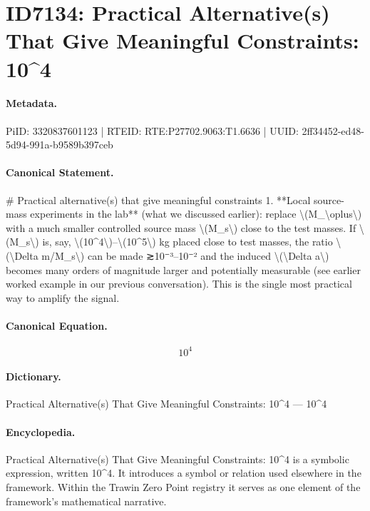 \section*{ID7134: Practical Alternative(s) That Give Meaningful Constraints: 10\textasciicircum{}4}
\paragraph{Metadata.}
PiID: 3320837601123 | RTEID: RTE:P27702.9063:T1.6636 | UUID: 2ff34452-ed48-5d94-991a-b9589b397ceb

\paragraph{Canonical Statement.}
\# Practical alternative(s) that give meaningful constraints 1. **Local source-mass experiments in the lab** (what we discussed earlier): replace \textbackslash{}(M\_\textbackslash{}oplus\textbackslash{}) with a much smaller controlled source mass \textbackslash{}(M\_s\textbackslash{}) close to the test masses. If \textbackslash{}(M\_s\textbackslash{}) is, say, \textbackslash{}(10\textasciicircum{}4\textbackslash{})–\textbackslash{}(10\textasciicircum{}5\textbackslash{}) kg placed close to test masses, the ratio \textbackslash{}(\textbackslash{}Delta m/M\_s\textbackslash{}) can be made ≳10⁻³–10⁻² and the induced \textbackslash{}(\textbackslash{}Delta a\textbackslash{}) becomes many orders of magnitude larger and potentially measurable (see earlier worked example in our previous conversation). This is the single most practical way to amplify the signal.

\paragraph{Canonical Equation.}
\[
10^4
\]

\paragraph{Dictionary.}
Practical Alternative(s) That Give Meaningful Constraints: 10\textasciicircum{}4 — 10\textasciicircum{}4

\paragraph{Encyclopedia.}
Practical Alternative(s) That Give Meaningful Constraints: 10\textasciicircum{}4 is a symbolic expression, written 10\textasciicircum{}4. It introduces a symbol or relation used elsewhere in the framework. Within the Trawin Zero Point registry it serves as one element of the framework's mathematical narrative.
